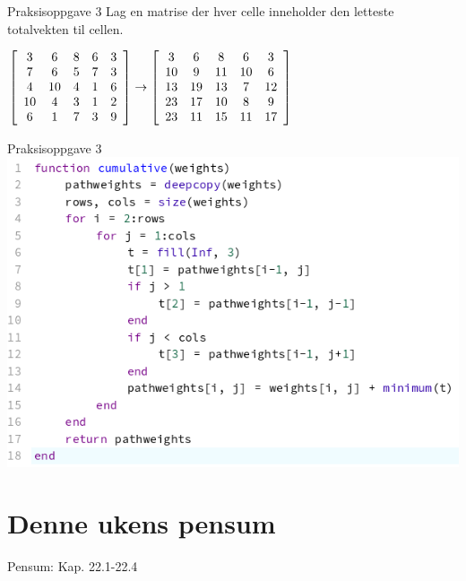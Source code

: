 \documentclass[14pt]{beamer}
\begin{document}
\begin{frame}{Praksisoppgave 3}
    Lag en matrise der hver celle inneholder den letteste totalvekten til cellen.

    \vfill
    \centering
    \begin{math}
        \left[
        \begin{array}{c c c c c}
           3 & 6 & 8 & 6 & 3 \\
           7 & 6 & 5 & 7 & 3 \\
           4 & 10 & 4 & 1 & 6 \\
           10 & 4 & 3 & 1 & 2 \\
           6 & 1 & 7 & 3 & 9 \\
        \end{array}
        \right]
        \rightarrow
        \left[
        \begin{array}{c c c c c}
           3 & 6 & 8 & 6 & 3 \\
           10 & 9 & 11 & 10 & 6 \\
           13 & 19 & 13 & 7 & 12 \\
           23 & 17 & 10 & 8 & 9 \\
           23 & 11 & 15 & 11 & 17 \\
        \end{array}
        \right]
    \end{math}
\end{frame}
\begin{frame}[fragile]{Praksisoppgave 3}
    \includegraphics[width=\textwidth]{images/06p_q3_sol.png}
\end{frame}

\section{Denne ukens pensum}
\begin{frame}[standout]
    Pensum: Kap. 22.1-22.4
\end{frame}
\end{document}
